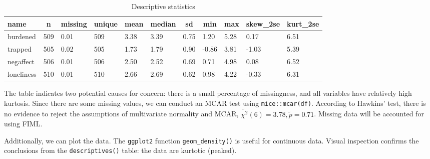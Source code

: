 \documentclass[
  man,floatsintext]{apa6}
\begin{document}
\begin{table}[tbp]

\begin{center}
\begin{threeparttable}

\caption{\label{tab:tabdesc}Descriptive statistics}

\begin{tabular}{lllllllllll}
\toprule
name & \multicolumn{1}{c}{n} & \multicolumn{1}{c}{missing} & \multicolumn{1}{c}{unique} & \multicolumn{1}{c}{mean} & \multicolumn{1}{c}{median} & \multicolumn{1}{c}{sd} & \multicolumn{1}{c}{min} & \multicolumn{1}{c}{max} & \multicolumn{1}{c}{skew\_2se} & \multicolumn{1}{c}{kurt\_2se}\\
\midrule
burdened & 509 & 0.01 & 509 & 3.38 & 3.39 & 0.75 & 1.20 & 5.28 & 0.17 & 6.51\\
trapped & 505 & 0.02 & 505 & 1.73 & 1.79 & 0.90 & -0.86 & 3.81 & -1.03 & 5.39\\
negaffect & 506 & 0.01 & 506 & 2.50 & 2.52 & 0.69 & 0.71 & 4.98 & 0.08 & 6.52\\
loneliness & 510 & 0.01 & 510 & 2.66 & 2.69 & 0.62 & 0.98 & 4.22 & -0.33 & 6.31\\
\bottomrule
\end{tabular}

\end{threeparttable}
\end{center}

\end{table}

The table indicates two potential causes for concern:
there is a small percentage of missingness,
and all variables have relatively high kurtosis.
Since there are some missing values,
we can conduct an MCAR test using \texttt{mice::mcar(df)}.
According to Hawkins' test,
there is no evidence to reject the assumptions of multivariate normality and MCAR, \(\tilde{\chi^2}(6) = 3.78, \tilde{p} = 0.71\).
Missing data will be accounted for using FIML.

Additionally, we can plot the data.
The \texttt{ggplot2} function \texttt{geom\_density()} is useful for continuous data.
Visual inspection confirms the conclusions from the \texttt{descriptives()} table:
the data are kurtotic (peaked).
\end{document}
